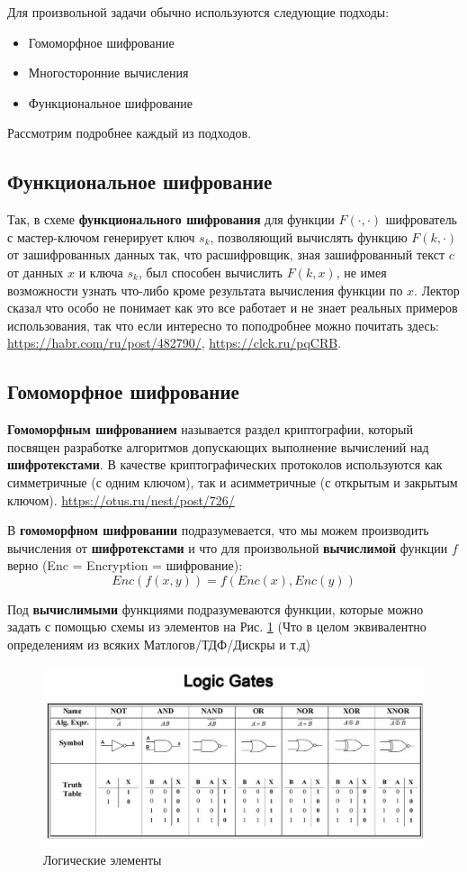Для произвольной задачи обычно используются следующие подходы:
\begin{itemize}
	\item Гомоморфное шифрование
	\item Многосторонние вычисления
	\item Функциональное шифрование 
\end{itemize}

Рассмотрим подробнее каждый из подходов.
\subsection {Функциональное шифрование}
Так, в схеме \textbf{функционального шифрования} для функции $F(\cdot, \cdot)$ шифрователь с мастер-ключом генерирует ключ $s_k$, позволяющий вычислять функцию $F(k, \cdot)$ от зашифрованных данных так, что расшифровщик, зная зашифрованный текст $c$ от данных $x$ и ключа $s_k$, был способен вычислить $F(k, x)$, не имея возможности узнать что-либо кроме результата вычисления функции по $x$. Лектор сказал что особо не понимает как это все работает и не знает реальных примеров использования, так что если интересно то поподробнее можно почитать здесь: \url{https://habr.com/ru/post/482790/}, \url{https://clck.ru/pqCRB}.


\subsection{Гомоморфное шифрование}
\textbf{Гомоморфным шифрованием} называется раздел криптографии, который посвящен разработке алгоритмов допускающих выполнение вычислений над \textbf{шифротекстами}. В качестве криптографических протоколов используются как симметричные (с одним ключом), так и асимметричные (с открытым и закрытым ключом). \url{https://otus.ru/nest/post/726/}

В \textbf{гомоморфном шифровании} подразумевается, что мы можем производить вычисления от \textbf{шифротекстами} и что для произвольной \textbf{вычислимой} функции $f$ верно (Enc = Encryption = шифрование):
$$Enc(f(x, y)) = f(Enc(x), Enc(y))$$

Под \textbf{вычислимыми} функциями подразумеваются функции, которые можно задать с помощью схемы из элементов на Рис. \ref{fig:logicscheme} (Что в целом эквивалентно определениям из всяких Матлогов/ТДФ/Дискры и т.д)
\begin{figure}[H]
	\centering
	\includegraphics[scale = 0.3]{26/logic_cheme.jpeg}
	\caption{Логические элементы}
	\label{fig:logicscheme}
\end{figure}

